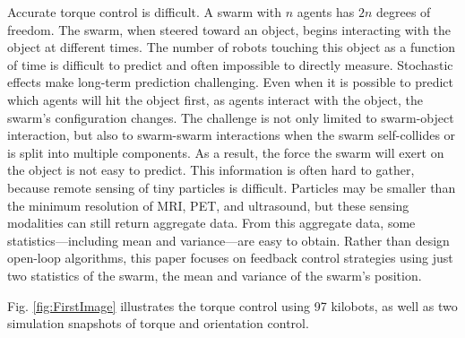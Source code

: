 Accurate torque control is difficult.
A swarm with $n$ agents has $2n$ degrees of freedom.  
The swarm, when steered toward an object, begins interacting with the object at different times. 
The number of robots touching this object as a function of time is difficult to predict and often impossible to directly measure.
Stochastic effects make long-term prediction challenging.
Even when it is possible to predict which agents will hit the object first, as agents interact with the object, the swarm's configuration changes.
The challenge is not only limited to swarm-object interaction, but also to swarm-swarm interactions when the swarm self-collides  or is split into multiple components. 
As a result, the force the swarm will exert on the object is not easy to predict.
This information is often hard to gather, because remote sensing of tiny particles is difficult.
Particles may be smaller than the minimum resolution of MRI, PET, and ultrasound, but these sensing modalities can still return aggregate data.
From this aggregate data,  some statistics---including mean and variance---are easy to obtain. 
Rather than design open-loop algorithms, this paper focuses on feedback control strategies using just two statistics of the swarm, the mean and variance of the swarm's position.


Fig. \ref{fig:FirstImage} illustrates the torque control using 97 kilobots, as well as two simulation snapshots of torque and orientation control.




